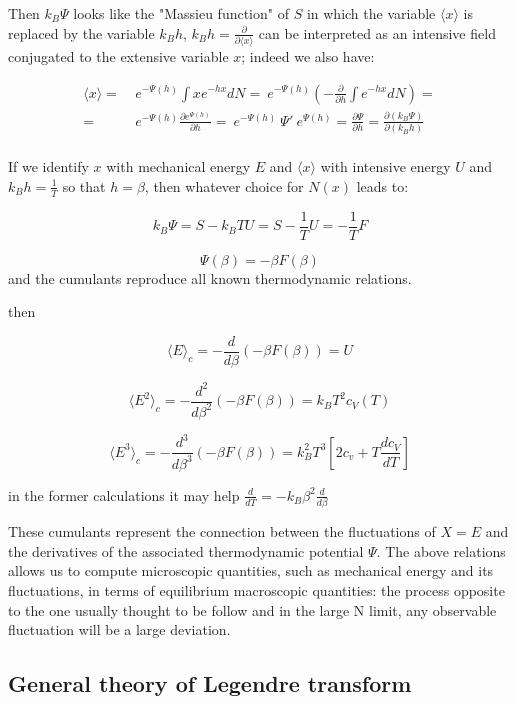 \documentclass{article}
\begin{document}
Then $k_B \Psi$ looks like the "Massieu function" of $S$ in which the variable $\langle x \rangle $ is replaced by the variable $k_B h$, $k_B h = \frac{\partial}{\partial \langle x \rangle}$ can be interpreted as an intensive field conjugated to the extensive variable $x$; indeed we also have:

\begin{align*}
\langle x \rangle = & \ e^{-\Psi(h)} \int x e^{-hx} dN = \ e^{-\Psi(h)} (-\frac{\partial}{\partial h} \int e^{-hx} dN) = \\
= & \ e^{-\Psi(h)} \frac{\partial  e^{\Psi(h)}}{\partial h} = \ e^{-\Psi(h)} \ \Psi' \  e^{\Psi(h)} = \frac{\partial \Psi}{\partial h} = \frac{\partial( k_B \Psi)}{\partial (k_B h)} \\
\end{align*}

If we identify $x$ with mechanical energy $E$ and $\langle x \rangle $ with intensive energy $U$ and $k_B h = \frac{1}{T}$ so that $h = \beta$, then whatever choice for $N(x)$ leads to:

$$k_B \Psi = S - k_B T U = S - \frac{1}{T} U = - \frac{1}{T} F$$

\begin{equation}
\Psi(\beta) = - \beta F(\beta)
\end{equation}
 and the cumulants reproduce all known thermodynamic relations.
 
then

$$\langle E \rangle_c = - \frac{d}{d \beta} (-\beta F(\beta)) =U$$

$$\langle E^2 \rangle_c = - \frac{d^2}{d \beta^2} (-\beta F(\beta)) = k_B T^2 c_V(T) $$

$$\langle E^3 \rangle_c = - \frac{d^3}{d \beta^3} (-\beta F(\beta)) = k_B^2 T^3 [2c_v + T \frac{d c_V}{d T}]$$

in the former calculations it may help $\frac{d}{d T} = - k_B \beta^2 \frac{d}{d \beta} $

These cumulants represent the connection between the fluctuations of $X = E$ and the derivatives of the associated thermodynamic potential $\Psi$. The above relations allows us to compute microscopic quantities, such as mechanical energy and its fluctuations, in terms of equilibrium macroscopic quantities: the process opposite to the one usually thought to be follow and in the large N limit, any observable fluctuation will be a large deviation.

\subsection{General theory of Legendre transform}
\end{document}
